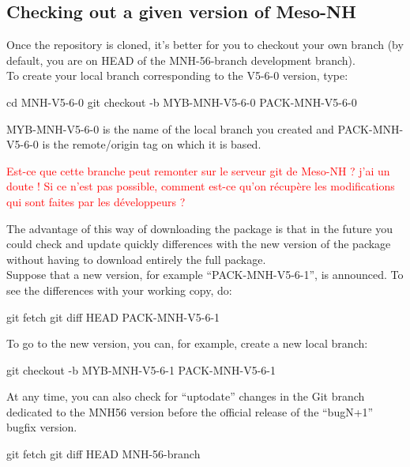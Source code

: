\subsection{Checking out a given version of Meso-NH}

Once the repository is cloned, it's better for you to checkout your own branch (by default, you are on HEAD of the MNH-56-branch development branch). \\

To create your local branch corresponding to the V5-6-0 version, type:
\begin{bashcode}
cd MNH-V5-6-0
git checkout -b MYB-MNH-V5-6-0 PACK-MNH-V5-6-0
\end{bashcode}

MYB-MNH-V5-6-0 is the name of the local branch you created and PACK-MNH-V5-6-0 is the remote/origin tag on which it is based.

\begin{importantblock}
\textcolor{red}{Est-ce que cette branche peut remonter sur le serveur git de Meso-NH ? j'ai un doute ! Si ce n'est pas possible, comment est-ce qu'on récupère les modifications qui sont faites par les développeurs ?}
\end{importantblock}

The advantage of this way of downloading the package is that in the future you could check and update quickly differences with the new version of the package without having to download entirely the full package. \\

Suppose that a new version, for example ``PACK-MNH-V5-6-1'', is announced. To see the differences with your working copy, do:
\begin{bashcode}
git fetch
git diff HEAD PACK-MNH-V5-6-1
\end{bashcode}

To go to the new version, you can, for example, create a new local branch:
\begin{bashcode}
git checkout -b MYB-MNH-V5-6-1 PACK-MNH-V5-6-1
\end{bashcode}

At any time, you can also check for ``uptodate'' changes in the Git branch dedicated to the MNH56 version before the official release of the ``bugN+1'' bugfix version.
\begin{bashcode}
git fetch
git diff HEAD MNH-56-branch
\end{bashcode}

